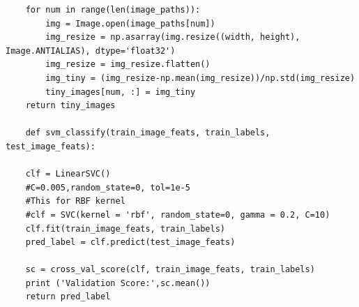 \documentclass{article}
\begin{document}
\begin{lstlisting}
    for num in range(len(image_paths)):
        img = Image.open(image_paths[num])
        img_resize = np.asarray(img.resize((width, height), Image.ANTIALIAS), dtype='float32')
        img_resize = img_resize.flatten()
        img_tiny = (img_resize-np.mean(img_resize))/np.std(img_resize)
        tiny_images[num, :] = img_tiny
    return tiny_images

    def svm_classify(train_image_feats, train_labels, test_image_feats):
    
    clf = LinearSVC()
    #C=0.005,random_state=0, tol=1e-5
    #This for RBF kernel
    #clf = SVC(kernel = 'rbf', random_state=0, gamma = 0.2, C=10)
    clf.fit(train_image_feats, train_labels)
    pred_label = clf.predict(test_image_feats)
    
    sc = cross_val_score(clf, train_image_feats, train_labels)
    print ('Validation Score:',sc.mean())
    return pred_label
    
\end{lstlisting}
\end{document}
